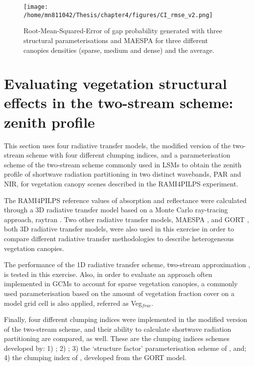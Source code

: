 
\begin{figure}
\centering
\texttt{[image: /home/mn811042/Thesis/chapter4/figures/CI\_rmse\_v2.png]}
\caption{Root-Mean-Squared-Error of gap probability generated with three structural parameterisations and MAESPA for three different canopies densities (sparse, medium and dense) and the average.} 
\label{fig:ci_rmse}
\end{figure}

\section{Evaluating vegetation structural effects in the two-stream scheme: zenith profile}

This section uses four radiative transfer models, the modified version of the two-stream scheme with four different clumping indices, and a parameterisation scheme of the two-stream scheme commonly used in LSMs to obtain the zenith profile of shortwave radiation partitioning in two distinct wavebands, PAR and NIR, for vegetation canopy scenes described in the RAMI4PILPS experiment.

The RAMI4PILPS reference values of absorption and reflectance were calculated through a 3D radiative transfer model based on a Monte Carlo ray-tracing approach, raytran \citep{Govaerts1995}. Two other radiative transfer models, MAESPA \citep{Wang1990,Medlyn2004,Medlyn2007}, and GORT \citep{Li1995,Ni1997}, both 3D radiative transfer models, were also used in this exercise in order to compare different radiative transfer methodologies to describe heterogeneous vegetation canopies.

The performance of the 1D radiative transfer scheme, two-stream approximation \citep{Sellers1985}, is tested in this exercise. Also, in order to evaluate an approach often implemented in GCMs to account for sparse vegetation canopies, a commonly used parameterisation based on the amount of vegetation fraction cover on a model grid cell is also applied, referred as Veg$_{frac}$.

Finally, four different clumping indices were implemented in the modified version of the two-stream scheme, and their ability to calculate shortwave radiation partitioning are compared, as well. These are the clumping indices schemes developed by: 1) \citet{Nilson1971}; 2) \citet{Kucharik1999}; 3) the `structure factor' parameterisation scheme of \citet{pinty2006}, and; 4) the clumping index of \citet{Ni-Meister2010}, developed from the GORT model.


